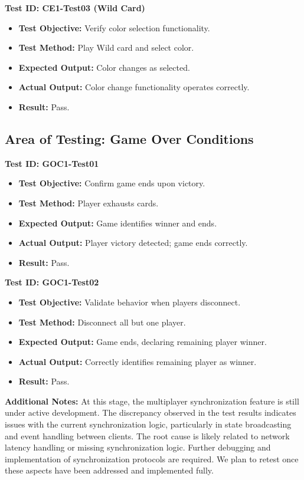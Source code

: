 \documentclass[12pt, titlepage]{article}
\begin{document}
\textbf{Test ID: CE1-Test03 (Wild Card)}
\begin{itemize}
    \item \textbf{Test Objective:} Verify color selection functionality.
    \item \textbf{Test Method:} Play Wild card and select color.
    \item \textbf{Expected Output:} Color changes as selected.
    \item \textbf{Actual Output:} Color change functionality operates correctly.
    \item \textbf{Result:} Pass.
\end{itemize}

\subsection{Area of Testing: Game Over Conditions}

\textbf{Test ID: GOC1-Test01}
\begin{itemize}
    \item \textbf{Test Objective:} Confirm game ends upon victory.
    \item \textbf{Test Method:} Player exhausts cards.
    \item \textbf{Expected Output:} Game identifies winner and ends.
    \item \textbf{Actual Output:} Player victory detected; game ends correctly.
    \item \textbf{Result:} Pass.
\end{itemize}

\textbf{Test ID: GOC1-Test02}
\begin{itemize}
    \item \textbf{Test Objective:} Validate behavior when players disconnect.
    \item \textbf{Test Method:} Disconnect all but one player.
    \item \textbf{Expected Output:} Game ends, declaring remaining player winner.
    \item \textbf{Actual Output:} Correctly identifies remaining player as winner.
    \item \textbf{Result:} Pass.
\end{itemize}






\noindent\textbf{Additional Notes:}  
At this stage, the multiplayer synchronization feature is still under active development. The discrepancy observed in the test results indicates issues with the current synchronization logic, particularly in state broadcasting and event handling between clients. The root cause is likely related to network latency handling or missing synchronization logic. Further debugging and implementation of synchronization protocols are required. We plan to retest once these aspects have been addressed and implemented fully.
\end{document}
